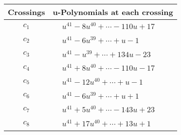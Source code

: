 \documentclass[1p]{elsarticle_modified}
\theoremstyle{definition}
\begin{document}
\begin{tabular}{m{50pt}|m{274pt}}
Crossings & \hspace{64pt}u-Polynomials at each crossing \\
\hline $$\begin{aligned}c_{1}\end{aligned}$$&$\begin{aligned}
&u^{41}-8 u^{40}+\cdots-110 u+17
\end{aligned}$\\
\hline $$\begin{aligned}c_{2}\end{aligned}$$&$\begin{aligned}
&u^{41}-6 u^{39}+\cdots+u-1
\end{aligned}$\\
\hline $$\begin{aligned}c_{3}\end{aligned}$$&$\begin{aligned}
&u^{41}- u^{39}+\cdots+134 u-23
\end{aligned}$\\
\hline $$\begin{aligned}c_{4}\end{aligned}$$&$\begin{aligned}
&u^{41}+8 u^{40}+\cdots-110 u-17
\end{aligned}$\\
\hline $$\begin{aligned}c_{5}\end{aligned}$$&$\begin{aligned}
&u^{41}-12 u^{40}+\cdots+u-1
\end{aligned}$\\
\hline $$\begin{aligned}c_{6}\end{aligned}$$&$\begin{aligned}
&u^{41}-6 u^{39}+\cdots+u+1
\end{aligned}$\\
\hline $$\begin{aligned}c_{7}\end{aligned}$$&$\begin{aligned}
&u^{41}+5 u^{40}+\cdots-143 u+23
\end{aligned}$\\
\hline $$\begin{aligned}c_{8}\end{aligned}$$&$\begin{aligned}
&u^{41}+17 u^{40}+\cdots+13 u+1
\end{aligned}$\\

\end{tabular}
\end{document}
